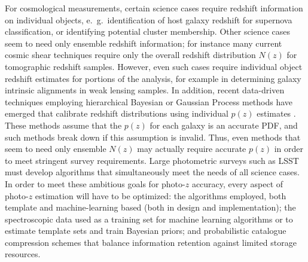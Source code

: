 For cosmological measurements, certain science cases require redshift information on individual objects, e.~g.~identification of host galaxy redshift for supernova classification, or identifying potential cluster membership.
Other science cases seem to need only ensemble redshift information; for instance many current cosmic shear techniques require only the overall redshift distribution $N(z)$ for tomographic redshift samples.  However,  even such cases require individual object redshift estimates for portions of the analysis, for example in determining galaxy intrinsic alignments in weak lensing samples.  In addition, recent data-driven techniques employing hierarchical Bayesian or Gaussian Process methods have emerged that calibrate redshift distributions using individual $p(z)$ estimates \citep[e.~g.~][]{Sanchez:2018}.  These methods assume that the $p(z)$ for each galaxy is an accurate PDF, and such methods break down if this assumption is invalid.  Thus, even methods that seem to need only ensemble $N(z)$ may actually require accurate $p(z)$ in order to meet stringent survey requirements.
Large photometric surveys such as LSST must develop algorithms that simultaneously meet the needs of all science cases.
In order to meet these ambitious goals for photo-$z$ accuracy, every aspect of photo-$z$ estimation will have to be optimized: the algorithms employed, both template and machine-learning based (both in design and implementation); the spectroscopic data used as a training set for machine learning algorithms or to estimate template sets and train Bayesian priors; and probabilistic catalogue compression schemes that balance information retention against limited storage resources.


